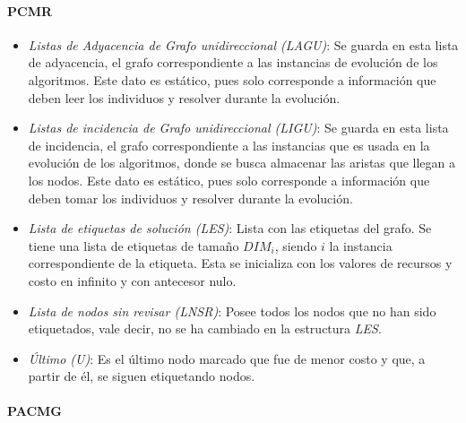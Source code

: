 \paragraph{PCMR}

\begin{itemize}

\item \emph{Listas de Adyacencia de Grafo unidireccional (LAGU)}: Se guarda en esta lista de adyacencia, el grafo correspondiente a las instancias de evolución de los algoritmos. Este dato es estático, pues solo corresponde a información que deben leer los individuos y resolver durante la evolución.

\item \emph{Listas de incidencia de Grafo unidireccional (LIGU)}: Se guarda en esta lista de incidencia, el grafo correspondiente a las instancias que es usada en la evolución de los algoritmos, donde se busca almacenar las aristas que llegan a los nodos. Este dato es estático, pues solo corresponde a información que deben tomar los individuos y resolver durante la evolución.

\item \emph{Lista de etiquetas de solución (LES)}: Lista con las etiquetas del grafo. Se tiene una lista de etiquetas de tamaño $DIM_i$, siendo $i$ la instancia correspondiente de la etiqueta. Esta se inicializa con los valores de recursos y costo en infinito y con antecesor nulo.

\item \emph{Lista de nodos sin revisar (LNSR)}: Posee todos los nodos que no han sido etiquetados, vale decir, no se ha cambiado en la estructura \emph{LES}.

\item \emph{Último (U)}: Es el último nodo marcado que fue de menor costo y que, a partir de él, se siguen etiquetando nodos.

\end{itemize}

\paragraph{PACMG}

